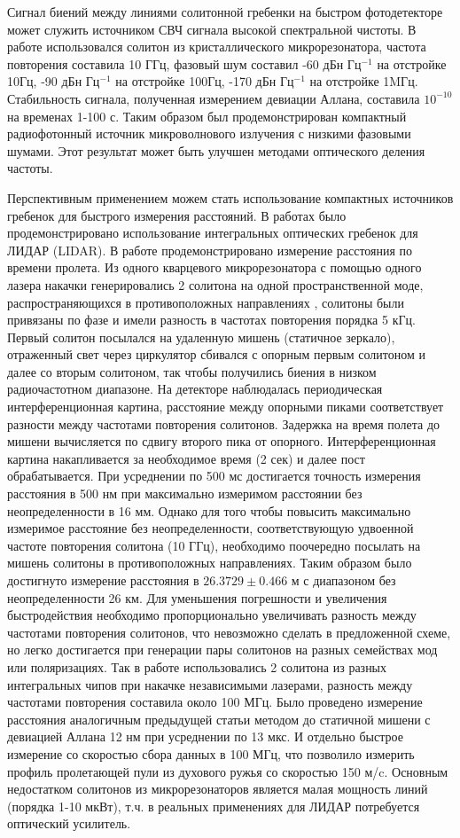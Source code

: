 Сигнал биений между линиями солитонной гребенки на быстром фотодетекторе может служить источником СВЧ сигнала высокой спектральной чистоты. В работе \cite{Liang2015} использовался солитон из кристаллического микрорезонатора, частота повторения составила 10 ГГц, фазовый шум составил -60 дБн Гц$^{-1}$ на отстройке 10Гц, -90 дБн Гц$^{-1}$ на отстройке 100Гц, -170 дБн Гц$^{-1}$ на отстройке 1MГц. Стабильность сигнала, полученная измерением девиации Аллана, составила $10^{-10}$ на временах 1-100 с. Таким образом был продемонстрирован компактный радиофотонный источник микроволнового излучения с низкими фазовыми шумами. Этот результат может быть улучшен методами оптического деления частоты.

Перспективным применением можем стать использование компактных источников гребенок для быстрого измерения расстояний. В работах \cite{Trocha887,Suh884} было продемонстрировано использование интегральных оптических гребенок для ЛИДАР (LIDAR). В работе \cite{Suh884} продемонстрировано измерение расстояния по времени пролета. Из одного кварцевого микрорезонатора с помощью одного лазера накачки генерировались 2 солитона на одной пространственной моде, распространяющихся в противоположных направлениях \cite{Yang2017cps}, солитоны были привязаны по фазе и имели разность в частотах повторения порядка 5 кГц. Первый солитон посылался на удаленную мишень (статичное зеркало), отраженный свет через циркулятор сбивался с опорным первым солитоном и далее со вторым солитоном, так чтобы получились биения в низком радиочастотном диапазоне. На детекторе наблюдалась периодическая интерференционная картина, расстояние между опорными пиками соответствует разности между частотами повторения солитонов. Задержка на время полета до мишени вычисляется по сдвигу второго пика от опорного. Интерференционная картина накапливается за необходимое время (2 сек) и далее пост обрабатывается. При усреднении по 500 мс достигается точность измерения расстояния в 500 нм при максимально измеримом расстоянии без неопределенности в 16 мм. Однако для того чтобы повысить максимально измеримое расстояние без неопределенности, соответствующую удвоенной частоте повторения солитона (10 ГГц), необходимо поочередно посылать на мишень солитоны в противоположных направлениях. Таким образом было достигнуто измерение расстояния в $26.3729\pm0.466$ м с диапазоном без неопределенности 26 км. Для уменьшения погрешности и увеличения быстродействия необходимо пропорционально увеличивать разность между частотами повторения солитонов, что невозможно сделать в предложенной схеме, но легко достигается при генерации пары солитонов на разных семействах мод или поляризациях. Так в работе \cite{Trocha887} использовались 2 солитона из разных интегральных чипов при накачке независимыми лазерами, разность между частотами повторения составила около 100 МГц. Было проведено измерение расстояния аналогичным предыдущей статьи методом до статичной мишени с девиацией Аллана 12 нм при усреднении по 13 мкс. И отдельно быстрое измерение со скоростью сбора данных в 100 МГц, что позволило измерить профиль пролетающей пули из духового ружья со скоростью 150 м/c. Основным недостатком солитонов из микрорезонаторов является малая мощность линий (порядка 1-10 мкВт), т.ч. в реальных применениях для ЛИДАР потребуется оптический усилитель.

